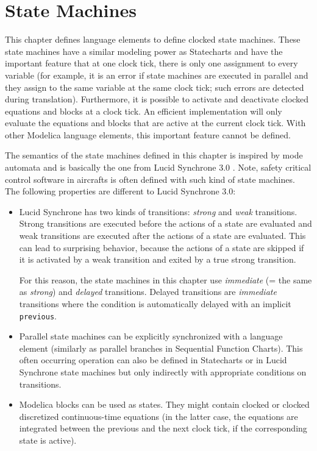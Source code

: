 \chapter{State Machines}\label{state-machines}

This chapter defines language elements to define clocked state machines.
These state machines have a similar modeling power as Statecharts \parencite{Harel1987Statecharts} and have the important feature that at one clock tick, there is only one assignment to every variable (for example, it is an error if state machines are executed in parallel and they assign to the same variable at the same clock tick; such errors are detected during translation).
Furthermore, it is possible to activate and deactivate clocked equations and blocks at a clock tick.
An efficient implementation will only evaluate the equations and blocks that are active at the current clock tick.
With other Modelica language elements, this important feature cannot be defined.

The semantics of the state machines defined in this chapter is inspired by mode automata and is basically the one from Lucid Synchrone 3.0 \parencite{Pouzet2006LucidSynchrone30}.
Note, safety critical control software in aircrafts is often defined with such kind of state machines.
The following properties are different to Lucid Synchrone 3.0:
\begin{itemize}
\item
  Lucid Synchrone has two kinds of transitions: \emph{strong} and
  \emph{weak} transitions. Strong transitions are executed before the
  actions of a state are evaluated and weak transitions are executed
  after the actions of a state are evaluated. This can lead to
  surprising behavior, because the actions of a state are skipped if it
  is activated by a weak transition and exited by a true strong
  transition.

  For this reason, the state machines in this chapter use \emph{immediate}
  (= the same as \emph{strong}) and \emph{delayed} transitions. Delayed
  transitions are \emph{immediate} transitions where the condition is
  automatically delayed with an implicit \lstinline!previous!.
\item
  Parallel state machines can be explicitly synchronized with a
  language element (similarly as parallel branches in Sequential
  Function Charts). This often occurring operation can also be defined
  in Statecharts or in Lucid Synchrone state machines but only
  indirectly with appropriate conditions on transitions.
\item
  Modelica blocks can be used as states. They might contain
  clocked or clocked discretized continuous-time equations (in the
  latter case, the equations are integrated between the previous and the
  next clock tick, if the corresponding state is active).
\end{itemize}

